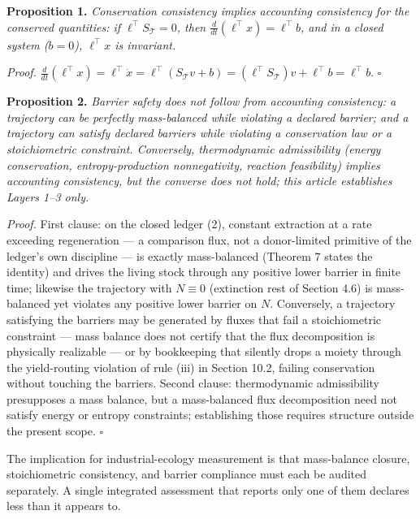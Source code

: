 \documentclass[11pt]{article}
\begin{document}
\textbf{Proposition 1.} \emph{Conservation consistency implies
accounting consistency for the conserved quantities: if
\(\ell^\top S_{\mathcal{T}} = 0\), then
\(\frac{d}{dt}(\ell^\top x) = \ell^\top b\), and in a closed system
(\(b = 0\)), \(\ell^\top x\) is invariant.}

\emph{Proof.}
\(\frac{d}{dt}(\ell^\top x) = \ell^\top \dot x = \ell^\top(S_{\mathcal{T}} v + b) = (\ell^\top S_{\mathcal{T}}) v + \ell^\top b = \ell^\top b\).
\ensuremath{\square}

\textbf{Proposition 2.} \emph{Barrier safety does not follow from
accounting consistency: a trajectory can be perfectly mass-balanced
while violating a declared barrier; and a trajectory can satisfy
declared barriers while violating a conservation law or a stoichiometric
constraint. Conversely, thermodynamic admissibility (energy
conservation, entropy-production nonnegativity, reaction feasibility)
implies accounting consistency, but the converse does not hold; this
article establishes Layers 1--3 only.}

\emph{Proof.} First clause: on the closed ledger (2), constant
extraction at a rate exceeding regeneration --- a comparison flux, not a
donor-limited primitive of the ledger's own discipline --- is exactly
mass-balanced (Theorem 7 states the identity) and drives the living
stock through any positive lower barrier in finite time; likewise the
trajectory with \(N \equiv 0\) (extinction rest of Section 4.6) is
mass-balanced yet violates any positive lower barrier on \(N\).
Conversely, a trajectory satisfying the barriers may be generated by
fluxes that fail a stoichiometric constraint --- mass balance does not
certify that the flux decomposition is physically realizable --- or by
bookkeeping that silently drops a moiety through the yield-routing
violation of rule (iii) in Section 10.2, failing conservation without
touching the barriers. Second clause: thermodynamic admissibility
presupposes a mass balance, but a mass-balanced flux decomposition need
not satisfy energy or entropy constraints; establishing those requires
structure outside the present scope. \ensuremath{\square}

The implication for industrial-ecology measurement is that mass-balance
closure, stoichiometric consistency, and barrier compliance must each be
audited separately. A single integrated assessment that reports only one
of them declares less than it appears to.
\end{document}
